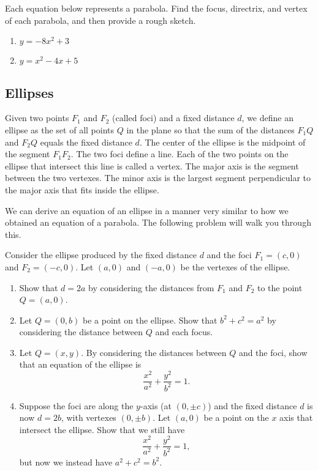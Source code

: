 \begin{problem}
Each equation below represents a parabola.  Find the focus, directrix, and vertex of each parabola, and then provide a rough sketch.
\begin{enumerate}
\item $y=-8x^2+3$
\item $y=x^2-4x+5$
\end{enumerate}
\end{problem}

\subsection{Ellipses}

\begin{definition}
Given two points $F_1$ and $F_2$ (called foci) and a fixed distance $d$, we define an ellipse as the set of all points $Q$ in the plane so that the sum of the distances $F_1Q$  and $F_2Q$ equals the fixed distance $d$. The center of the ellipse is the midpoint of the segment $F_1F_2$. The two foci define a line.  Each of the two points on the ellipse that intersect this line is called a vertex. The major axis is the segment between the two vertexes. The minor axis is the largest segment perpendicular to the major axis that fits inside the ellipse.
\end{definition}

We can derive an equation of an ellipse in a manner very similar to how we obtained an equation of a parabola.  The following problem will walk you through this.  

\begin{problem*}[Optional]
Consider the ellipse produced by the fixed distance $d$ and the foci $F_1=(c,0)$ and $F_2=(-c,0)$. Let $(a,0)$ and $(-a,0)$ be the vertexes of the ellipse.
\begin{enumerate}
\item Show that $d=2a$ by considering the distances from $F_1$ and $F_2$ to the point $Q=(a,0)$.
\item Let $Q=(0,b)$ be a point on the ellipse.  Show that $b^2+c^2=a^2$ by considering the distance between $Q$ and each focus.
\item Let $Q=(x,y)$. By considering the distances between $Q$ and the foci, show that an equation of the ellipse is $$\frac{x^2}{a^2}+\frac{y^2}{b^2}=1.$$
\item Suppose the foci are along the $y$-axis (at $(0,\pm c)$) and the fixed distance $d$ is now $d=2b$, with vertexes $(0,\pm b)$. Let $(a,0)$ be a point on the $x$ axis that intersect the ellipse.  Show that we still have $$\frac{x^2}{a^2}+\frac{y^2}{b^2}=1,$$ but now we instead have $a^2+c^2=b^2$.
\end{enumerate}
\end{problem*}


